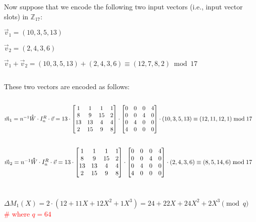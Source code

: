 $ $

Now suppose that we encode the following two input vectors (i.e., input vector slots) in $\mathbb{Z}_{17}$:

$\vec{v}_1 = (10, 3, 5, 13)$

$\vec{v}_2 = (2, 4, 3, 6)$

$\vec{v}_1 + \vec{v}_2 = (10, 3, 5, 13) + (2, 4, 3, 6) \equiv (12, 7, 8, 2) \bmod 17$

$ $

These two vectors are encoded as follows:

$ $

$\vec{m}_1 = n^{-1} \hathat W \cdot I_n^R \cdot \vec{v} = 13 \cdot \begin{bmatrix}
1 & 1 & 1 & 1\\
8 & 9 & 15 & 2\\
13 & 13 & 4 & 4\\
2 & 15 & 9 & 8\\
\end{bmatrix} \cdot \begin{bmatrix}
0 & 0 & 0 & 4\\
0 & 0 & 4 & 0\\
0 & 4 & 0 & 0\\
4 & 0 & 0 & 0\\
\end{bmatrix} \cdot (10, 3, 5, 13) \equiv (12, 11, 12,1)  \bmod 17$

$ $

$\vec{m}_2 = n^{-1} \hathat W \cdot I_n^R \cdot \vec{v} = 13 \cdot \begin{bmatrix}
1 & 1 & 1 & 1\\
8 & 9 & 15 & 2\\
13 & 13 & 4 & 4\\
2 & 15 & 9 & 8\\
\end{bmatrix} \cdot \begin{bmatrix}
0 & 0 & 0 & 4\\
0 & 0 & 4 & 0\\
0 & 4 & 0 & 0\\
4 & 0 & 0 & 0\\
\end{bmatrix} \cdot (2, 4, 3, 6) \equiv (8, 5, 14, 6) \bmod 17$

$ $

$ $

$\Delta M_1(X) = 2\cdot(12 + 11X + 12X^2 + 1X^3) = 24 + 22X + 24X^2 + 2X^3 \pmod{q}$ \textcolor{red}{\text{ } \# where $q = 64$}

